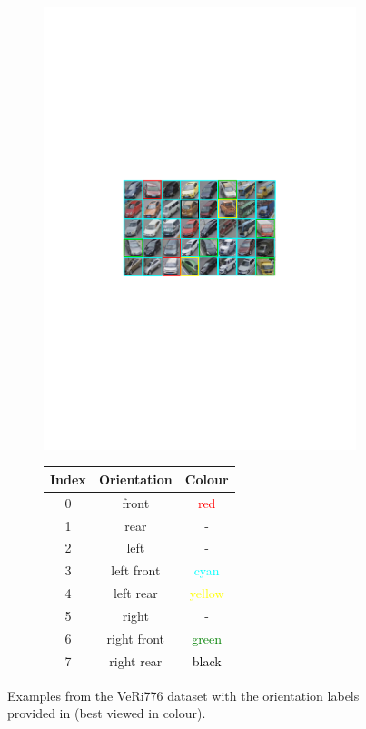 \documentclass[10pt,twocolumn,letterpaper]{article}
\begin{document}
\begin{figure}[t]
  \begin{subfigure}{.6\textwidth}
    \includegraphics[width=\linewidth,trim=5cm 11cm 5cm 11cm,clip=true]{images/veri_orients.pdf}
  \end{subfigure}
  \begin{subfigure}{.4\textwidth}
    \centering
    \begin{tabular}{c | c | c}
      \hline
      Index & Orientation & Colour \\
      \hline
      0 & front & \textcolor{red}{red} \\
      1 & rear & - \\
      2 & left  & - \\
      3 & left front & \textcolor{cyan}{cyan}  \\
      4 & left rear & \textcolor{yellow}{yellow}  \\
      5 & right  & - \\
      6 & right front & \textcolor{green}{green} \\
      7 & right rear & \textcolor{black}{black} \\
      \hline
    \end{tabular}
  \end{subfigure}
  \caption{Examples from the VeRi776 dataset with the orientation labels provided in \cite{wang2017orientation} (best viewed in colour).}
  \label{F:veri_veh_orientations}
\end{figure}
\end{document}
